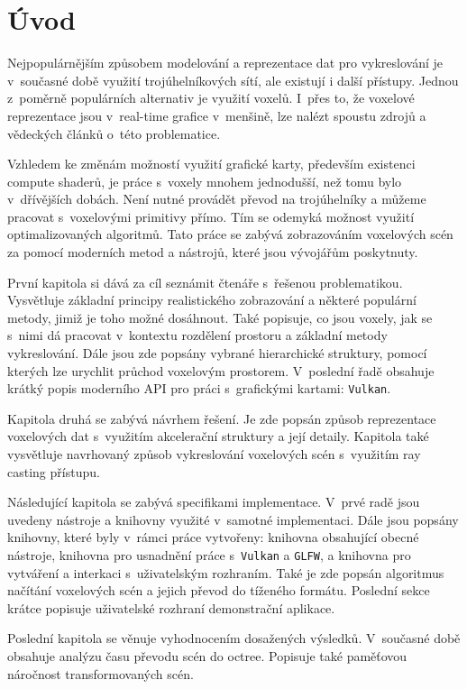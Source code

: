\chapter{Úvod}
\label{uvod}
Nejpopulárnějším způsobem modelování a reprezentace dat pro vykreslování je v~současné době využití trojúhelníkových sítí, ale existují i další přístupy. Jednou z~poměrně populárních alternativ je využití voxelů. I~přes to, že voxelové reprezentace jsou v~real-time grafice v~menšině, lze nalézt spoustu zdrojů a vědeckých článků o~této problematice.

Vzhledem ke změnám možností využití grafické karty, především existenci compute shaderů, je práce s~voxely mnohem jednodušší, než tomu bylo v~dřívějších dobách. Není nutné provádět převod na trojúhelníky a můžeme pracovat s~voxelovými primitivy přímo. Tím se odemyká možnost využití optimalizovaných algoritmů. Tato práce se zabývá zobrazováním voxelových scén za pomocí moderních metod a nástrojů, které jsou vývojářům poskytnuty.

První kapitola si dává za cíl seznámit čtenáře s~řešenou problematikou. Vysvětluje základní principy realistického zobrazování a některé populární metody, jimiž je toho možné dosáhnout. Také popisuje, co jsou voxely, jak se s~nimi dá pracovat v~kontextu rozdělení prostoru a základní metody vykreslování. Dále jsou zde popsány vybrané hierarchické struktury, pomocí kterých lze urychlit průchod voxelovým prostorem. V~poslední řadě obsahuje krátký popis moderního API pro práci s~grafickými kartami: \texttt{Vulkan}.

Kapitola druhá se zabývá návrhem řešení. Je zde popsán způsob reprezentace voxelových dat s~využitím akcelerační struktury a její detaily. Kapitola také vysvětluje navrhovaný způsob vykreslování voxelových scén s~využitím ray casting přístupu.

Následující kapitola se zabývá specifikami implementace. V~prvé radě jsou uvedeny nástroje a knihovny využité v~samotné implementaci. Dále jsou popsány knihovny, které byly v~rámci práce vytvořeny: knihovna obsahující obecné nástroje, knihovna pro usnadnění práce s~\texttt{Vulkan} a \texttt{GLFW}, a knihovna pro vytváření a interkaci s~uživatelským rozhraním. Také je zde popsán algoritmus načítání voxelových scén a jejich převod do tíženého formátu. Poslední sekce krátce popisuje uživatelské rozhraní demonstrační aplikace.

Poslední kapitola se věnuje vyhodnocením dosažených výsledků. V~současné době obsahuje analýzu času převodu scén do octree. Popisuje také paměťovou náročnost transformovaných scén.

